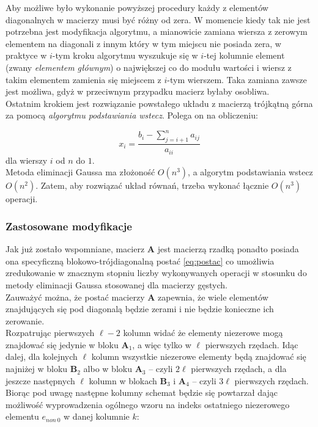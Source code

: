 \documentclass{mk-polish-lab-report}
\newcommand{\mA}{\bm{A}}
\newcommand{\mB}{\bm{B}}
\begin{document}
\noindent Aby możliwe było wykonanie powyższej procedury każdy z elementów diagonalnych w macierzy musi być różny od zera. W momencie kiedy tak nie jest potrzebna jest modyfikacja algorytmu, a mianowicie zamiana wiersza z zerowym elementem na diagonali z innym który w tym miejscu nie posiada zera, w praktyce w $i$-tym kroku algorytmu wyszukuje się w $i$-tej kolumnie element (zwany \emph{elementem głównym}) o największej co do modułu wartości i wiersz z takim elementem zamienia się miejscem z $i$-tym wierszem. Taka zamiana zawsze jest możliwa, gdyż w przeciwnym przypadku macierz byłaby osobliwa. \\

\noindent Ostatnim krokiem jest rozwiązanie powstałego układu z macierzą trójkątną górna za pomocą \emph{algorytmu podstawiania wstecz}. Polega on na obliczeniu:

\begin{equation*}
x_i = \frac{b_i - \sum_{j = i+1}^n a_{ij}}{a_{ii}}
\end{equation*}
dla wierszy $i$ od $n$ do $1$.  \\

\noindent Metoda eliminacji Gaussa ma złożoność $O(n^3)$, a algorytm podstawiania wstecz $O(n^2)$. Zatem, aby rozwiązać układ równań, trzeba wykonać łącznie $O(n^3)$ operacji.

\subsubsection{Zastosowane modyfikacje}

Jak już zostało wspomniane, macierz $\mA$ jest macierzą rzadką ponadto posiada ona specyficzną blokowo-trójdiagonalną postać \eqref{eq:postac} co umożliwia zredukowanie w znacznym stopniu liczby wykonywanych operacji w stosunku do metody eliminacji Gaussa stosowanej dla macierzy gęstych. \\

\noindent Zauważyć można, że postać macierzy $\mA$ zapewnia, że wiele elementów znajdujących się pod diagonalą będzie zerami i nie będzie konieczne ich zerowanie. \\

\noindent Rozpatrując pierwszych $\ell-2$ kolumn widać że elementy niezerowe mogą znajdować się jedynie w bloku $\mA_1$, a więc tylko w $\ell$ pierwszych rzędach. Idąc dalej, dla kolejnych $\ell$ kolumn wszystkie niezerowe elementy będą znajdować się najniżej w bloku $\mB_2$ albo w bloku $\mA_3$ -- czyli $2\ell$ pierwszych rzędach, a dla jeszcze następnych $\ell$ kolumn w blokach $\mB_3$ i $\mA_4$ -- czyli $3\ell$ pierwszych rzędach. Biorąc pod uwagę następne kolumny schemat będzie się powtarzał dając możliwość wyprowadzenia ogólnego wzoru na indeks ostatniego niezerowego elementu $e_{non~0}$ w danej kolumnie $k$:
\end{document}
